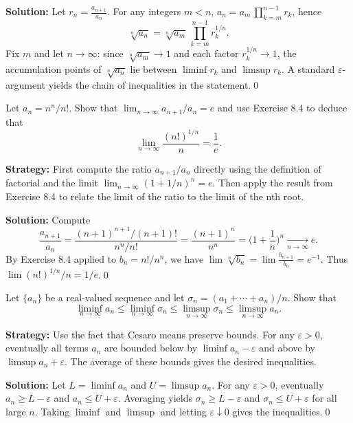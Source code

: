 \bigskip\noindent\textbf{Solution:}
Let \(r_n=\frac{a_{n+1}}{a_n}\). For any integers \(m<n\), \(a_n=a_m\,\prod_{k=m}^{n-1} r_k\), hence
\[\sqrt[n]{a_n}=\sqrt[n]{a_m}\, \prod_{k=m}^{n-1} r_k^{1/n}.\]
Fix \(m\) and let \(n\to\infty\): since \(\sqrt[n]{a_m}\to 1\) and each factor \(r_k^{1/n}\to 1\), the accumulation points of \(\sqrt[n]{a_n}\) lie between \(\liminf r_k\) and \(\limsup r_k\). A standard \(\varepsilon\)-argument yields the chain of inequalities in the statement.\qed


\begin{problembox}
Let \(a_n = n^n / n!\). Show that \(\lim_{n \to \infty} a_{n+1} / a_n = e\) and use Exercise 8.4 to deduce that
\[\lim_{n \to \infty} \frac{(n!)^{1/n}}{n} = \frac{1}{e}.\]
\end{problembox}

\noindent\textbf{Strategy:} First compute the ratio \(a_{n+1}/a_n\) directly using the definition of factorial and the limit \(\lim_{n\to\infty}(1+1/n)^n=e\). Then apply the result from Exercise 8.4 to relate the limit of the ratio to the limit of the nth root.

\bigskip\noindent\textbf{Solution:}
Compute
\[\frac{a_{n+1}}{a_n}=\frac{(n+1)^{n+1}/(n+1)!}{n^n/n!}=\frac{(n+1)^n}{n^n}=\Big(1+\frac{1}{n}\Big)^n\xrightarrow[n\to\infty]{} e.\]
By Exercise 8.4 applied to \(b_n=n!/n^n\), we have \(\lim \sqrt[n]{b_n}=\lim \frac{b_{n+1}}{b_n}=e^{-1}\). Thus \(\lim (n!)^{1/n}/n=1/e\).\qed


\begin{problembox}
Let \(\{a_n\}\) be a real-valued sequence and let \(\sigma_n = (a_1 + \cdots + a_n)/n\). Show that
\[\liminf_{n \to \infty} a_n \leq \liminf_{n \to \infty} \sigma_n \leq \limsup_{n \to \infty} \sigma_n \leq \limsup_{n \to \infty} a_n.\]
\end{problembox}

\noindent\textbf{Strategy:} Use the fact that Cesaro means preserve bounds. For any \(\varepsilon>0\), eventually all terms \(a_n\) are bounded below by \(\liminf a_n-\varepsilon\) and above by \(\limsup a_n+\varepsilon\). The average of these bounds gives the desired inequalities.

\bigskip\noindent\textbf{Solution:}
Let \(L=\liminf a_n\) and \(U=\limsup a_n\). For any \(\varepsilon>0\), eventually \(a_n\ge L-\varepsilon\) and \(a_n\le U+\varepsilon\). Averaging yields \(\sigma_n\ge L-\varepsilon\) and \(\sigma_n\le U+\varepsilon\) for all large \(n\). Taking \(\liminf\) and \(\limsup\) and letting \(\varepsilon\downarrow 0\) gives the inequalities.\qed


